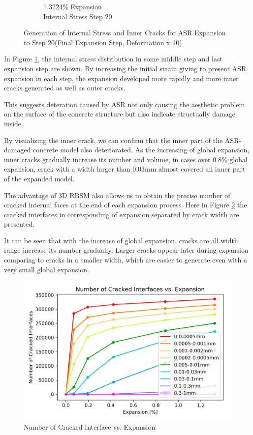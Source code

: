 \begin{figure}[h!]
\begin{subfigure}{.25\textwidth}
      \caption{1.3224\% Expansion\\Internal Stress Step 20}
    \end{subfigure}

    

\caption{Generation of Internal Stress and Inner Cracks for ASR Expansion to Step 20(Final Expansion Step, Deformation x 10)}
\label{fig:A30_P75_stress}
\end{figure}

\clearpage

In Figure \ref{fig:A30_P75_stress}, the internal stress distribution in some middle step and last expansion step are shown. By increasing the initial strain giving to present ASR expansion in each step, the expansion developed more rapidly and more inner cracks generated as well as outer cracks.

This suggests deteration caused by ASR not only causing the aesthetic problem on the surface of the concrete structure but also indicate structually damage inside.

By visualizing the inner crack, we can confirm that the inner part of the ASR-damaged concrete model also deteriorated. As the increasing of global expansion, inner cracks gradually increase its number and volume, in cases over 0.8\% global expansion, crack with a width larger than 0.03mm almost covered all inner part of the expanded model.

The advantage of 3D RBSM also allows us to obtain the precise number of cracked internal faces at the end of each expansion process. Here in Figure \ref{A30P75CRACK} the cracked interfaces in corresponding of expansion separated by crack width are presented.

It can be seen that with the increase of global expansion, cracks are all width range increase its number gradually. Larger cracks appear later during expansion comparing to cracks in a smaller width, which are easier to generate even with a very small global expansion.

\begin{figure}[ht!]
\centering
\includegraphics[width=.8\linewidth]{Files/interface/A30P75CRACK.png}
  \caption{Number of Cracked Interface vs. Expansion}
  \label{A30P75CRACK}
\end{figure}
